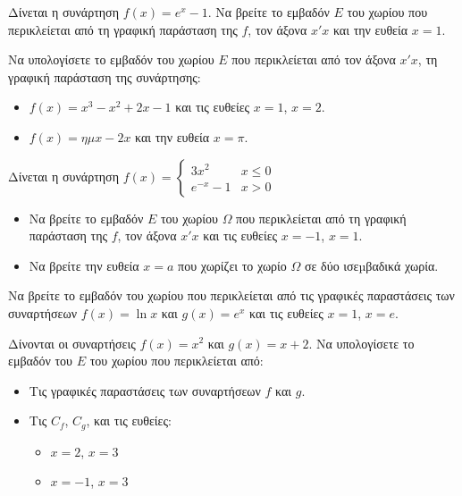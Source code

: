 \documentclass{../presentation}
\begin{document}
\begin{askisi}
  Δίνεται η συνάρτηση $f(x)=e^x-1$. Να βρείτε το εμβαδόν $E$ του χωρίου που περικλείεται από τη γραφική παράσταση της $f$, τον άξονα $x'x$ και την ευθεία $x=1$.
\end{askisi}

\begin{askisi}
  Να υπολογίσετε το εμβαδόν του χωρίου $E$ που περικλείεται από τον άξονα $x'x$, τη γραφική παράσταση της συνάρτησης:
  \begin{itemize}[<+->]
    \item $f(x)=x^3-x^2+2x-1$ και τις ευθείες $x=1$, $x=2$.
    \item $f(x)=ημx-2x$ και την ευθεία $x=π$.
  \end{itemize}
\end{askisi}


\begin{askisi}
  Δίνεται η συνάρτηση $f(x)=\begin{cases}
      3x^2     & x \leq 0 \\
      e^{-x}-1 & x>0
    \end{cases}$
  \begin{itemize}[<+->]
    \item Να βρείτε το εμβαδόν $E$ του χωρίου $Ω$ που περικλείεται από τη γραφική παράσταση της $f$, τον άξονα $x'x$ και τις ευθείες $x=-1$, $x=1$.
    \item Να βρείτε την ευθεία $x=a$ που χωρίζει το χωρίο $Ω$ σε δύο ισεµβαδικά χωρία.
  \end{itemize}
\end{askisi}

\begin{askisi}
  Να βρείτε το εμβαδόν του χωρίου που περικλείεται από τις γραφικές παραστάσεις των συναρτήσεων $f(x)=\ln x$ και $g(x)=e^x$ και τις ευθείες $x=1$, $x=e$.
\end{askisi}


\begin{askisi}
  Δίνονται οι συναρτήσεις $f(x)=x^2$ και $g(x)=x+2$. Να υπολογίσετε το εμβαδόν του $E$ του χωρίου που περικλείεται από:
  \begin{itemize}[<+->]
    \item Τις γραφικές παραστάσεις των συναρτήσεων $f$ και $g$.
    \item Τις $C_f$, $C_g$, και τις ευθείες:
          \begin{itemize}[<+->]
            \item $x=2$, $x=3$
            \item $x=-1$, $x=3$
          \end{itemize}
  \end{itemize}
\end{askisi}
\end{document}

